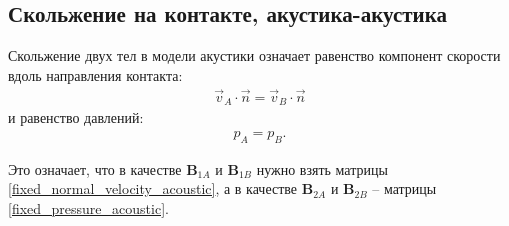 \subsection{Скольжение на контакте, акустика-акустика}
Скольжение двух тел в модели акустики означает равенство компонент скорости вдоль направления контакта:
\begin{eqnarray}
\vec{v}_A \cdot \vec{n} = \vec{v}_B \cdot \vec{n}
\end{eqnarray}
и равенство давлений:
\begin{eqnarray}
p_A = p_B.
\end{eqnarray}

Это означает, что в качестве $\mathbf{B}_{1A}$ и $\mathbf{B}_{1B}$ нужно взять матрицы \eqref{fixed_normal_velocity_acoustic}, а в качестве $\mathbf{B}_{2A}$ и $\mathbf{B}_{2B}$ -- матрицы \eqref{fixed_pressure_acoustic}.








